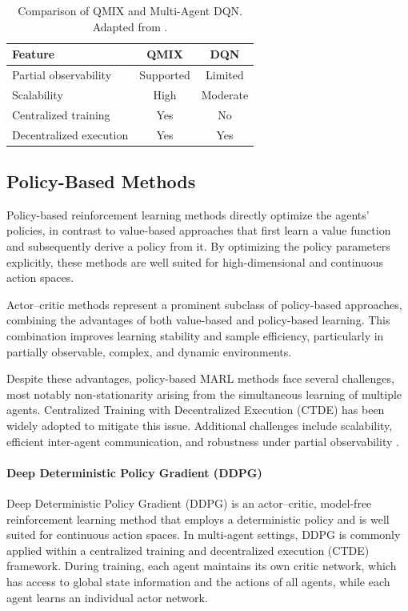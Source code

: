 \begin{table}[htbp]
\centering
\caption{Comparison of QMIX and Multi-Agent DQN. Adapted from \cite{ekecki2025uavcontrolsurvey}.}
\label{tab:qmix_dqn_comparison}
\begin{tabular}{lcc}
\hline
\textbf{Feature} & \textbf{QMIX} & \textbf{DQN} \\
\hline
Partial observability & Supported & Limited \\
Scalability & High & Moderate \\
Centralized training & Yes & No \\
Decentralized execution & Yes & Yes \\
\hline
\end{tabular}
\end{table}


\subsection{Policy-Based Methods}
Policy-based reinforcement learning methods directly optimize the agents’ policies, in contrast to value-based approaches that first learn a value function and subsequently derive a policy from it. By optimizing the policy parameters explicitly, these methods are well suited for high-dimensional and continuous action spaces. 

Actor–critic methods represent a prominent subclass of policy-based approaches, combining the advantages of both value-based and policy-based learning. This combination improves learning stability and sample efficiency, particularly in partially observable, complex, and dynamic environments.

Despite these advantages, policy-based MARL methods face several challenges, most notably non-stationarity arising from the simultaneous learning of multiple agents. Centralized Training with Decentralized Execution (CTDE) has been widely adopted to mitigate this issue. Additional challenges include scalability, efficient inter-agent communication, and robustness under partial observability \cite{ekecki2025uavcontrolsurvey}.


\paragraph{Deep Deterministic Policy Gradient (DDPG)}
Deep Deterministic Policy Gradient (DDPG) is an actor–critic, model-free reinforcement learning method that employs a deterministic policy and is well suited for continuous action spaces. In multi-agent settings, DDPG is commonly applied within a centralized training and decentralized execution (CTDE) framework. During training, each agent maintains its own critic network, which has access to global state information and the actions of all agents, while each agent learns an individual actor network. 

